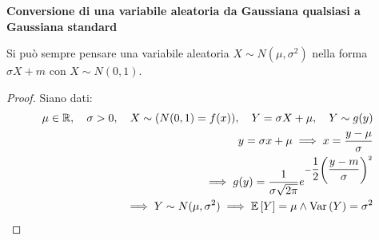 \begin{defn}
    \textbf{Conversione di una variabile aleatoria da Gaussiana qualsiasi a Gaussiana standard} \\
    \begin{prop}
        Si può sempre pensare una variabile aleatoria $X \sim N(\mu, \sigma^2)$
        nella forma $\sigma X + m$ con $X \sim N(0, 1)$.
    \end{prop}

    \begin{proof}
        Siano dati:
        \begin{equation*}
            \begin{aligned}
                \mu \in \mathbb{R}, \quad \sigma > 0, \quad X \sim (N(0,1) = f(x)), \quad Y = \sigma X + \mu, \quad Y \sim g(y)\\
                y = \sigma x + \mu \implies x = \dfrac{y-\mu}{\sigma}\\
                \implies g(y) = \frac{1}{\sigma \sqrt{2 \pi}} e^{- \dfrac{1}{2} \left( \dfrac{y - m}{\sigma}\right)^2 }\\
                \implies Y \sim N(\mu, \sigma^2) \implies \mathbb{E}\left[Y\right] = \mu \land \text{Var}\left(Y\right) = \sigma^2
            \end{aligned}
        \end{equation*}
    \end{proof}

\end{defn}



